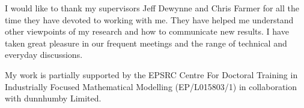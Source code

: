 \documentclass[main.tex]{subfiles}
\begin{document}
I would like to thank my supervisors Jeff Dewynne and Chris Farmer for
all the time they have devoted to working with me. They have helped me
understand other viewpoints of my research and how to communicate new
results. I have taken great pleasure in our frequent meetings and the
range of technical and everyday discussions.

My work is partially supported by the EPSRC Centre For Doctoral
Training in Industrially Focused Mathematical Modelling (EP/L015803/1)
in collaboration with dunnhumby Limited.
\end{document}
